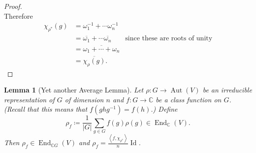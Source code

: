 \documentclass[12pt]{article}
\newcommand{\cx}{\mathbb{C}}
\newcommand\inv[1]{#1^{-1}}
\newcommand{\vbrack}[1]{\left \langle #1 \right \rangle}
\newtheorem{lemma}[theorem]{Lemma}
\theoremstyle{definition}
\DeclareMathOperator\Aut{Aut}
\DeclareMathOperator\End{End}
\DeclareMathOperator\Id{Id}
\begin{document}
\begin{proof}
\begin{equation}
    \end{equation}
    Therefore 
    \begin{equation}
        \begin{split}
            \chi_{\rho^*}(g) & = \inv{\omega_1} + \dotsb \inv{\omega_n} \\
            & = \overline{\omega_1} + \dotsb \overline{\omega_n} \qquad \text{since these are roots of unity} \\
            & = \overline{\omega_1 + \dotsb + \omega_n} \\
            & = \overline{\chi_{\rho}(g)}.
        \end{split}
    \end{equation}
\end{proof}
\begin{lemma}[Yet another Average Lemma]
    Let $\rho : G \to \Aut(V)$ be an irreducible representation of $G$ of dimension $n$ and $f : G \to \cx$ be a class function on $G$. (Recall that this means that $f \left( g h \inv{g} \right) = f(h)$.) Define 
    \begin{equation}
        \rho_f \coloneqq  \frac{1}{|G|} \sum\limits_{g \in G} f(g) \rho(g) \in \End_{\cx}(V).
    \end{equation}
    Then $\rho_f \in \End_{\cx G}(V)$ and $\rho_f = \frac{\vbrack{f , \chi_{\rho^*}}}{n} \Id$.
\end{lemma}
\end{document}
